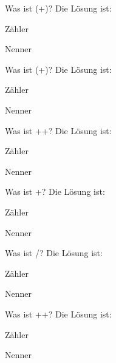 \documentclass{ximera}
\begin{document}
\begin{shuffle}
\begin{question}
Was ist \cdot(+)?
Die Lösung ist:
\begin{solution}
Zähler 
\end{solution}
\begin{solution}
Nenner 
\end{solution}
\end{question}


\begin{question}
Was ist (+)\cdot{}?
Die Lösung ist:
\begin{solution}
Zähler 
\end{solution}
\begin{solution}
Nenner 
\end{solution}
\end{question}


\begin{question}
Was ist ++?
Die Lösung ist:
\begin{solution}
Zähler 
\end{solution}
\begin{solution}
Nenner 
\end{solution}
\end{question}


\begin{question}
Was ist +\cdot{}?
Die Lösung ist:
\begin{solution}
Zähler 
\end{solution}
\begin{solution}
Nenner 
\end{solution}
\end{question}


\begin{question}
Was ist /?
Die Lösung ist:
\begin{solution}
Zähler 
\end{solution}
\begin{solution}
Nenner 
\end{solution}
\end{question}


\begin{question}
Was ist ++?
Die Lösung ist:
\begin{solution}
Zähler 
\end{solution}
\begin{solution}
Nenner 
\end{solution}
\end{question}



\end{shuffle}
\end{document}
